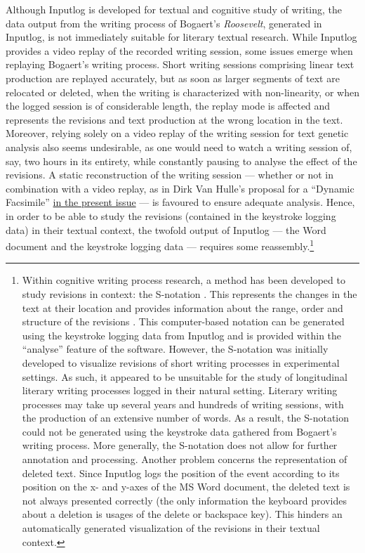 \begin{paper}
Although Inputlog is developed for textual and cognitive study of
writing, the data output from the writing process of Bogaert's
\emph{Roosevelt}, generated in Inputlog, is not immediately suitable for
literary textual research. While Inputlog provides a video replay of the
recorded writing session, some issues emerge when replaying Bogaert's
writing process. Short writing sessions comprising linear text
production are replayed accurately, but as soon as larger segments of text
are relocated or deleted, when the writing is characterized with
non-linearity, or when the logged session is of considerable length, the
replay mode is affected and represents the revisions and text production
at the wrong location in the text. Moreover, relying solely on a video
replay of the writing session for text genetic analysis also seems
undesirable, as one would need to watch a writing session of, say, two
hours in its entirety, while constantly pausing to analyse the effect of
the revisions. A static reconstruction of the writing session --- whether
or not in combination with a video replay, as in Dirk Van Hulle's
proposal for a ``Dynamic Facsimile'' \hyperref[vanhullewip]{in the present issue} \citep{van_hulle_dynamic_2021} --- is favoured to
ensure adequate analysis. Hence, in order to be able to study the
revisions (contained in the keystroke logging data) in their textual
context, the twofold output of Inputlog --- the Word document and the
keystroke logging data --- requires some reassembly.\footnote{Within
  cognitive writing process research, a method has been developed to
  study revisions in context: the S-notation \citep{kollberg_s-notation_1998}. This
  represents the changes in the text at their location and provides
  information about the range, order and structure of the revisions \citep[91]{kollberg_studying_2002}. This computer-based
  notation can be generated using the keystroke logging data from
  Inputlog and is provided within the ``analyse'' feature of the software.
  However, the S-notation was initially developed to visualize revisions
  of short writing processes in experimental settings. As such, it appeared to be unsuitable for the study of longitudinal literary writing processes
  logged in their natural setting. Literary writing processes may take
  up several years and hundreds of writing sessions, with the production
  of an extensive number of words. As a result, the S-notation could not
  be generated using the keystroke data gathered from Bogaert's writing
  process. More generally, the S-notation does not allow for further
  annotation and processing. Another problem concerns the representation
  of deleted text. Since Inputlog logs the position of the event
  according to its position on the x- and y-axes of the MS Word
  document, the deleted text is not always presented correctly (the only
  information the keyboard provides about a deletion is usages of the
  delete or backspace key). This hinders an automatically generated
  visualization of the revisions in their textual context.}


\end{paper}
